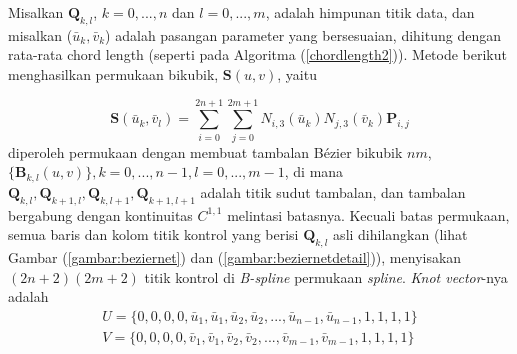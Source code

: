 Misalkan {$\textbf{Q}_{k,l}$}, $k = 0, ..., n$ 
dan $l = 0, ..., m$, adalah himpunan titik data, 
dan misalkan {($\bar{u}_k, \bar{v}_k$)} adalah 
pasangan parameter yang bersesuaian, dihitung dengan 
rata-rata chord length (seperti pada Algoritma 
(\ref{chordlength2})). Metode berikut menghasilkan 
permukaan bikubik, $\textbf{S}(u, v)$, yaitu

\begin{equation}
	\textbf{S}(\bar{u}_k, \bar{v}_l) = 
	\sum_{i=0}^{2n+1}\sum_{j=0}^{2m+1}
	N_{i,3}(\bar{u}_k)N_{j,3}(\bar{v}_k)\textbf{P}_{i,j}
	\label{rumus:localbicubic} 
\end{equation}
diperoleh permukaan dengan membuat tambalan Bézier bikubik $nm$, 
$\{\textbf{B}_{k,l}(u, v)\}, k = 0, ..., n-1, l = 0, ... , m-1$, 
di mana $\textbf{Q}_{k,l}, \textbf{Q}_{k+1,l}, 
\textbf{Q}_{k,l+1}, \textbf{Q}_{k+1,l+1}$ adalah 
titik sudut tambalan, dan tambalan bergabung dengan 
kontinuitas $C^{1,1}$ melintasi batasnya. Kecuali batas 
permukaan, semua baris dan kolom titik kontrol yang 
berisi {$\textbf{Q}_{k,l}$} asli dihilangkan 
(lihat Gambar (\ref{gambar:beziernet}) 
dan (\ref{gambar:beziernetdetail})), menyisakan $(2n + 2)(2m + 2)$ 
titik kontrol di \textit{B-spline} permukaan \textit{spline}. 
\textit{Knot vector}-nya adalah
\begin{equation}
	\begin{split}
		U = \{0,0,0,0,\bar{u}_1,\bar{u}_1,\bar{u}_2,\bar{u}_2,...,
		\bar{u}_{n-1},\bar{u}_{n-1},1,1,1,1\} \\
		V = \{0,0,0,0,\bar{v}_1,\bar{v}_1,\bar{v}_2,\bar{v}_2,...,
		\bar{v}_{m-1},\bar{v}_{m-1},1,1,1,1\}
	\end{split}
	\label{rumus:knotvectorbicubic} 
\end{equation}

